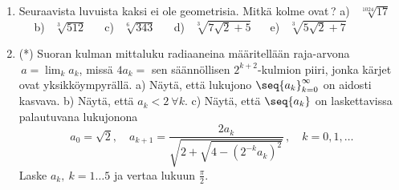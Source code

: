 \begin{enumerate}
\item
Seuraavista luvuista kaksi ei ole geometrisia. Mitkä kolme ovat\,? \vspace{1mm}\newline
a) \ $\sqrt[1024]{17}$ $\quad$ b) \ $\sqrt[3]{512}$ $\quad$ c) \ $\sqrt[6]{343}$ $\quad$
d) \ $\sqrt[3]{7\sqrt{2}+5}$ $\quad$ e) \ $\sqrt[3]{5\sqrt{2}+7}$

\item (*) \label{H-II-1: suoran kulman mitta}
Suoran kulman mittaluku radiaaneina määritellään raja-arvona $\,a=\lim_k a_k$, missä $4a_k=$ sen 
säännöllisen $2^{k+2}$-kulmion piiri, jonka kärjet ovat yksikköympyrällä. \vspace{1mm}\newline
a) Näytä, että lukujono $\seq{a_k}_{k=0}^\infty$ on aidosti kasvava. \newline
b) Näytä, että $a_k < 2\ \forall k$. \newline
c) Näytä, että $\seq{a_k}$ on laskettavissa palautuvana lukujonona
\[
a_0=\sqrt{2}, \quad 
a_{k+1}=\frac{2a_k}{\sqrt{2+\sqrt{4-(2^{-k}a_k)^2}}}\,, \quad k=0,1,\ldots
\]
Laske $a_k,\ k=1 \ldots 5$ ja vertaa lukuun $\tfrac{\pi}{2}$.

\end{enumerate}